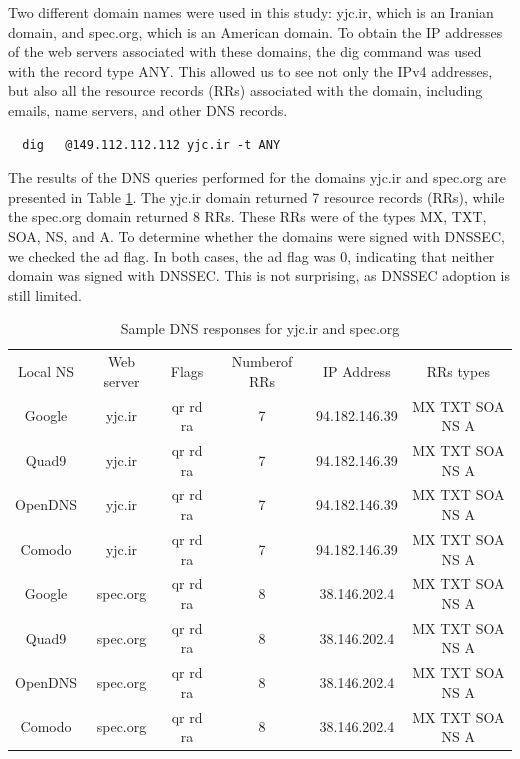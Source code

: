 \documentclass[eng]{class}
\begin{document}
Two different domain names were used in this study: yjc.ir, which is an Iranian domain, and spec.org, which is an American domain.
To obtain the IP addresses of the web servers associated with these domains, the dig command was used with the record type ANY.
This allowed us to see not only the IPv4 addresses, but also all the resource records (RRs) associated with the domain, including emails, name servers, and other DNS records.
\begin{lstlisting}
  dig   @149.112.112.112 yjc.ir -t ANY
\end{lstlisting}
The results of the DNS queries performed for the domains yjc.ir and spec.org are presented in Table \ref*{tab-4}.
The yjc.ir domain returned 7 resource records (RRs), while the spec.org domain returned 8 RRs.
These RRs were of the types MX, TXT, SOA, NS, and A. To determine whether the domains were signed with DNSSEC, we checked the ad flag.
In both cases, the ad flag was 0, indicating that neither domain was signed with DNSSEC.
This is not surprising, as DNSSEC adoption is still limited.
\begin{table}[H]
  \tiny
  \begin{tabular}{cccccc}
    \linewidth=0cm
    Local NS & Web server & Flags    & Numberof RRs & IP Address    & RRs types       \\
    Google   & yjc.ir     & qr rd ra & 7            & 94.182.146.39 & MX TXT SOA NS A \\
    Quad9    & yjc.ir     & qr rd ra & 7            & 94.182.146.39 & MX TXT SOA NS A \\
    OpenDNS  & yjc.ir     & qr rd ra & 7            & 94.182.146.39 & MX TXT SOA NS A \\
    Comodo   & yjc.ir     & qr rd ra & 7            & 94.182.146.39 & MX TXT SOA NS A \\
    Google   & spec.org   & qr rd ra & 8            & 38.146.202.4  & MX TXT SOA NS A \\
    Quad9    & spec.org   & qr rd ra & 8            & 38.146.202.4  & MX TXT SOA NS A \\
    OpenDNS  & spec.org   & qr rd ra & 8            & 38.146.202.4  & MX TXT SOA NS A \\
    Comodo   & spec.org   & qr rd ra & 8            & 38.146.202.4  & MX TXT SOA NS A \\
  \end{tabular}
  \caption{Sample DNS responses for yjc.ir and spec.org}
  \label{tab-4}
\end{table}
\end{document}
